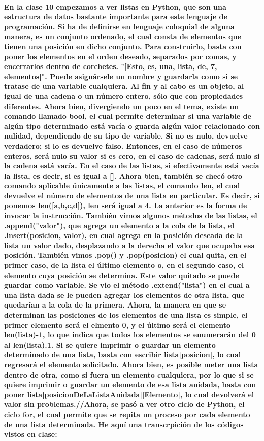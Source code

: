 \documentclass{book}
\begin{document}
	\paragraph{En la clase 10 empezamos a ver listas en Python, que son una estructura de datos bastante importante para este lenguaje de programación. Si ha de definirse en lenguaje coloquial de alguna manera, es un conjunto ordenado, el cual consta de elementos que tienen una posición en dicho conjunto. Para construirlo, basta con poner los elementos en el orden deseado, separados por comas, y encerrarlos dentro de corchetes. "[Esto, es, una, lista, de, 7, elementos]". Puede asignársele un nombre y guardarla como si se tratase de una variable cualquiera. Al fin y al cabo es un objeto, al igual de una cadena o un número entero, sólo que con propiedades diferentes. Ahora bien, divergiendo un poco en el tema, existe un comando llamado bool, el cual permite determinar si una variable de algún tipo determinado está vacía o guarda algún valor relacionado con nulidad, dependiendo de su tipo de variable. Si no es nulo, devuelve verdadero; si lo es devuelve falso. Entonces, en el caso de números enteros, será nulo su valor si es cero, en el caso de cadenas, será nulo si la cadena está vacía. En el caso de las listas, si efectivamente está vacía la lista, es decir, si es igual a []. Ahora bien, también se checó otro comando aplicable únicamente a las listas, el comando len, el cual devuelve el número de elementos de una lista en particular. Es decir, si ponemos len([a,b,c,d]), len será igual a 4. La anterior es la forma de invocar la instrucción. También vimos algunos métodos de las listas, el .append("valor"), que agrega un elemento a la cola de la lista, el .insert(posicion, valor), en cual agrega en la posición deseada de la lista un valor dado, desplazando a la derecha el valor que ocupaba esa posición. También vimos .pop() y .pop(posicion) el cual quita, en el primer caso, de la lista el último elemento o, en el segundo caso, el elemento cuya posición se determina. Este valor quitado se puede guardar como variable. Se vio el método .extend("lista") en el cual a una lista dada se le pueden agregar los elementos de otra lista, que quedarían a la cola de la primera. Ahora, la manera en que se determinan las posiciones de los elementos de una lista es simple, el primer elemento será el elmento 0, y el último será el elemento len(lista)-1, lo que indica que todos los elementos se enumerarán del 0 al len(lista).1. Si se quiere imprimir o guardar un elemento determinado de una lista, basta con escribir lista[posicion], lo cual regresará el elemento solicitado. Ahora bien, es posible meter una lista dentro de otra, como si fuera un elemento cualquiera, por lo que si se quiere imprimir o guardar un elemento de esa lista anidada, basta con poner lista[posicionDeLaListaAnidada][Elemento], lo cual devolverá el valor sin problemas.//Ahora, se pasó a ver otro ciclo de Python, el ciclo for, el cual permite que se repita un proceso por cada elemento de una lista determinada. He aquí una transcrpición de los códigos vistos en clase:}
\end{document}
